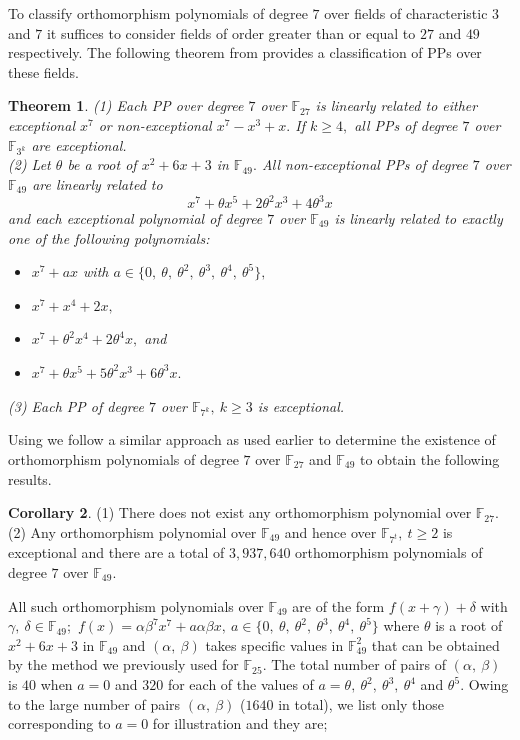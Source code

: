 \documentclass[12pt,a4wide, reqno]{amsart}
\newtheorem{theorem}{Theorem}[section]
\theoremstyle{definition}
\newtheorem{corollary}[theorem]{Corollary}
\theoremstyle{remark}
\numberwithin{equation}{section}
\begin{document}
To classify orthomorphism polynomials of degree $7$ over fields of characteristic $3$ and $7$ it suffices to consider fields of order greater than or equal to $27$ and $49$ respectively. The following theorem from \cite{xfan} provides a classification of PPs over these fields.
\begin{theorem}\cite[Theorem~14,  Theorem~16]{xfan} \label{thmm}(1) Each PP over degree $7$ over $\mathbb{F}_{27}$ is linearly related to either exceptional $x^7$ or non-exceptional $x^7-x^3+x.$ If $k\geq 4,$ all PPs of degree $7$ over $\mathbb{F}_{3^k}$ are exceptional.\\
(2) Let $\theta$ be a root of $x^2+6x+3$ in $\mathbb{F}_{49}.$ All non-exceptional PPs of degree $7$  over $\mathbb{F}_{49}$ are linearly related to $$x^7+\theta x^5+2\theta^2x^3+4\theta^3x$$ and each exceptional polynomial of degree $7$ over $\mathbb{F}_{49}$ is linearly related to exactly one of the following polynomials:
\begin{itemize}
    \item 
    $x^7+ax$ with $a\in\{0,~\theta,~\theta^2,~\theta^3,~\theta^4,~\theta^5\},$
    \item 
    $x^7+x^4+2x,$
    \item 
    $x^7+\theta^2x^4+2\theta^4x,$ and
    \item 
    $x^7+\theta x^5+5\theta^2x^3+6\theta^3x.$
\end{itemize}
(3) Each PP of degree $7$ over $\mathbb{F}_{7^k},~k\geq 3$ is exceptional.
\end{theorem}
Using  we follow a similar approach as used earlier to determine the existence of orthomorphism polynomials of degree $7$ over $\mathbb{F}_{27}$ and $\mathbb{F}_{49}$ to obtain the following results.
\begin{corollary}\label{cor3.5}
    (1) There does not exist any orthomorphism polynomial over $\mathbb{F}_{27}.$\\
    (2) Any orthomorphism polynomial over $\mathbb{F}_{49}$ and hence over $\mathbb{F}_{7^t},~t\geq 2$ is exceptional and there are a total of $3,937,640$ orthomorphism polynomials of degree $7$ over $\mathbb{F}_{49}.$
    \end{corollary}
    All such orthomorphism polynomials over $\mathbb{F}_{49}$ are of the form $f(x+\gamma)+\delta$ with $\gamma,~\delta \in \mathbb{F}_{49}$;~$f(x)=\alpha\beta^7x^7+a \alpha\beta x,~a\in\{0,~\theta,~\theta^2,~\theta^3,~\theta^4,~\theta^5\}$ where $\theta$ is a root of $x^2+6x+3$ in $\mathbb{F}_{49}$ and $(\alpha,~\beta)$ takes specific values in $\mathbb{F}_{49}^2$ that can be obtained by the method we previously used for $\mathbb{F}_{25}.$ The total number of pairs of $(\alpha,~\beta)$ is $40$ when $a=0$ and $320$ for each of the values of $a=\theta,~\theta^2,~\theta^3,~\theta^4$ and $\theta^5.$ Owing to the large number of pairs $(\alpha,~\beta)$  ($1640$ in total), we list only those corresponding to $a=0$ for illustration and they are;\\
\end{document}
